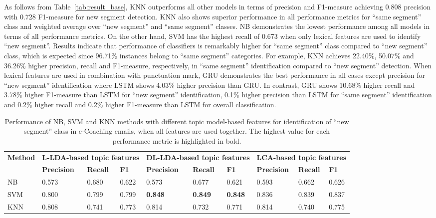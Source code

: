 \documentclass{amia}
\begin{document}
As follows from Table~\ref{tab:result_base}, KNN outperforms all other models in terms of precision and F1-measure achieving 0.808 precision with 0.728 F1-measure for new segment detection. KNN also shows superior performance in all performance metrics for ``same segment'' class and weighted average over ``new segment'' and ``same segment'' classes. NB demonstrates the lowest performance among all models in terms of all performance metrics. On the other hand, SVM has the highest recall of 0.673 when only lexical features are used to identify ``new segment''. Results indicate that performance of classifiers is remarkably higher for ``same segment'' class compared to ``new segment'' class, which is expected since 96.71\% instances belong to ``same segment'' categories. For example, KNN achieves 22.40\%, 50.07\% and 36.26\% higher precision, recall and F1-measure, respectively, in ``same segment'' identification compared to ``new segment'' detection. When lexical features are used in combination with punctuation mark, GRU demonstrates the best performance in all cases except precision for ``new segment'' identification where LSTM shows 4.03\% higher precision than GRU. In contrast, GRU shows 10.68\% higher recall and 3.78\%  higher F1-measure than LSTM for ``new segment'' identification, 0.1\% higher precision than LSTM for ``same segment'' identification and 0.2\% higher recall and 0.2\%  higher F1-measure than LSTM for overall classification. \\  

\begin{table}[ht]
\centering
\caption{Performance of NB, SVM and KNN methods with different topic model-based features for identification of ``new segment'' class in e-Coaching emails, when all features are used together. The highest value for each performance metric is highlighted in bold.}
\label{tab:result_boundary}
  \begin{tabular}{|l|l|l|l|l|l|l|l|l|l|}
  \hline
   \multirow{2}{*}{\textbf{Method}} & \multicolumn{3}{|c|}{\textbf{L-LDA-based topic features}} & \multicolumn{3}{|c|}{\textbf{DL-LDA-based topic features}}  & \multicolumn{3}{|c|}{\textbf{LCA-based topic features}} \\\cline{2-10} & \textbf{Precision}  & \textbf{Recall} & \textbf{F1} & \textbf{Precision}  & \textbf{Recall} & \textbf{F1} & \textbf{Precision}  & \textbf{Recall} & \textbf{F1}\\ \hline  
    
 NB & 0.573 & 0.680 & 0.622 & 0.573 & 0.677 & 0.621 & 0.593 & 0.662 & 0.626 \\ \hline
 SVM & 0.800 & 0.799 & 0.799 & \textbf{0.848} & \textbf{0.849} & \textbf{0.848} & 0.836 & 0.839 & 0.837  \\ \hline
 KNN & 0.808 & 0.741 & 0.773 & 0.814 & 0.732 & 0.771 & 0.814 & 0.740 & 0.775 \\ \hline
  \end{tabular}
\end{table} 
\end{document}
